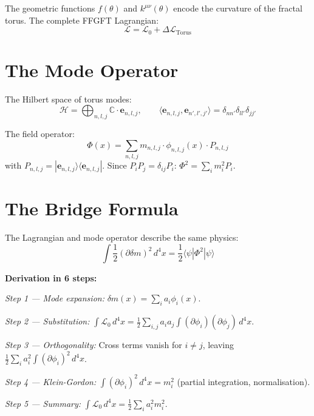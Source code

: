 The geometric functions $f(\theta)$ and $k^{\mu\nu}(\theta)$ encode
the curvature of the fractal torus. The complete FFGFT Lagrangian:
\begin{equation}
  \boxed{
    \mathcal{L} = \mathcal{L}_0 + \Delta\mathcal{L}_{\text{Torus}}
  }
\end{equation}

\section{The Mode Operator}

The Hilbert space of torus modes:
\begin{equation}
  \mathcal{H} = \bigoplus_{n,l,j} \mathbb{C}\cdot\mathbf{e}_{n,l,j},
  \qquad
  \langle\mathbf{e}_{n,l,j},\mathbf{e}_{n',l',j'}\rangle
  = \delta_{nn'}\delta_{ll'}\delta_{jj'}
\end{equation}

The field operator:
\begin{equation}
  \Phi(x) = \sum_{n,l,j} m_{n,l,j}\cdot\phi_{n,l,j}(x)\cdot P_{n,l,j}
\end{equation}
with $P_{n,l,j} = |\mathbf{e}_{n,l,j}\rangle\langle\mathbf{e}_{n,l,j}|$.
Since $P_iP_j = \delta_{ij}P_i$: $\Phi^2 = \sum_i m_i^2 P_i$.

\section{The Bridge Formula}

The Lagrangian and mode operator describe the same physics:
\begin{equation}
  \boxed{
    \int\frac{1}{2}(\partial\delta m)^2\,d^4x
    = \frac{1}{2}\langle\psi|\Phi^2|\psi\rangle
  }
  \label{eq:bridge}
\end{equation}

\textbf{Derivation in 6 steps:}

\textit{Step 1 — Mode expansion:} $\delta m(x) = \sum_i a_i\phi_i(x)$.

\textit{Step 2 — Substitution:}
$\int\mathcal{L}_0\,d^4x
= \tfrac{1}{2}\sum_{i,j}a_ia_j\int(\partial\phi_i)(\partial\phi_j)\,d^4x$.

\textit{Step 3 — Orthogonality:}
Cross terms vanish for $i\neq j$, leaving
$\tfrac{1}{2}\sum_i a_i^2\int(\partial\phi_i)^2\,d^4x$.

\textit{Step 4 — Klein-Gordon:}
$\int(\partial\phi_i)^2\,d^4x = m_i^2$ (partial integration, normalisation).

\textit{Step 5 — Summary:}
$\int\mathcal{L}_0\,d^4x = \tfrac{1}{2}\sum_i a_i^2 m_i^2$.

